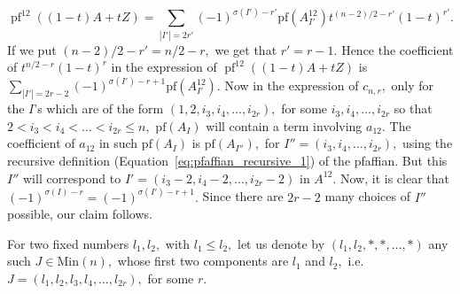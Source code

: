 \documentclass[9pt, BCOR=2mm]{amsart}
\numberwithin{equation}{section}
\numberwithin{equation}{section}
\begin{document}
$$\operatorname{pf}^{12}((1-t)A+tZ)=\sum_{|I'|=2r'}(-1)^{\sigma(I')-r'} \mathrm{pf}(A^{12}_{I'}) t^{(n-2)/2-r'}(1-t)^{r'}.$$ If we put $(n-2)/2-r'=n/2-r,$ we get that $r'=r-1.$ Hence the coefficient of $t^{n/2-r}(1-t)^r$ in the expression of $\operatorname{pf}^{12}((1-t)A+tZ)$ is $\sum_{|I'|=2r-2}(-1)^{\sigma(I')-r+1} \mathrm{pf}(A^{12}_{I'}).$ 
Now in the expression of $c_{n,r},$ only for the $I$'s which are of the form  $(1,2, i_3,i_4,\dots,i_{2r}),$ for some $i_3,i_4,\dots,i_{2r}$ so that $2<i_3<i_4<\dots<i_{2r}\le n,$ $\mathrm{pf}(A_{I})$ will contain a term involving $a_{12}.$ The coefficient of $a_{12}$ in such $\mathrm{pf}(A_{I})$ is $\mathrm{pf}(A_{I''}),$ for $I''=(i_3,i_4,\dots,i_{2r}),$ using the recursive definition (Equation~\ref{eq:pfaffian_recursive_1}) of the pfaffian. But this $I''$ will correspond to $I'=(i_3-2,i_4-2,\dots,i_{2r}-2)$ in $A^{12}.$ Now, it is clear that $(-1)^{\sigma(I)-r} = (-1)^{\sigma(I')-r+1}.$ Since there are $2r-2$ many choices of $I''$ possible, our claim follows. 

For two fixed numbers $l_1, l_2,$ with $l_1\le l_2,$ let us denote by $(l_1,l_2,*,*,\dots,*)$ any such $J\in \mathrm{Min}(n),$ whose first two components are $l_1$ and $l_2,$ i.e. $J=(l_1,l_2, l_3,l_4,\dots,l_{2r}),$ for some $r.$
\end{document}
